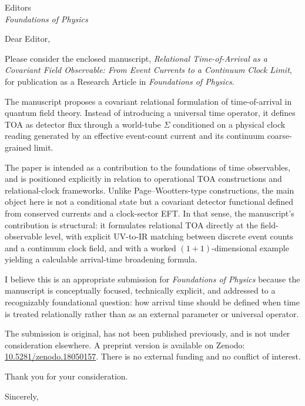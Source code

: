 \documentclass[a4paper,11pt]{letter}
\date{\today}
\begin{document}
    
    \begin{letter}{Editors\\ \textit{Foundations of Physics}}

\opening{Dear Editor,}

Please consider the enclosed manuscript,
\textit{Relational Time-of-Arrival as a Covariant Field Observable: From Event Currents to a Continuum Clock Limit},
for publication as a Research Article in \textit{Foundations of Physics}.

The manuscript proposes a covariant relational formulation of time-of-arrival in quantum field theory. Instead of introducing a universal time operator, it defines TOA as detector flux through a world-tube $\Sigma$ conditioned on a physical clock reading generated by an effective event-count current and its continuum coarse-grained limit.

The paper is intended as a contribution to the foundations of time observables, and is positioned explicitly in relation to operational TOA constructions and relational-clock frameworks. Unlike Page--Wootters-type constructions, the main object here is not a conditional state but a covariant detector functional defined from conserved currents and a clock-sector EFT. In that sense, the manuscript's contribution is structural: it formulates relational TOA directly at the field-observable level, with explicit UV-to-IR matching between discrete event counts and a continuum clock field, and with a worked $(1+1)$-dimensional example yielding a calculable arrival-time broadening formula.

I believe this is an appropriate submission for \textit{Foundations of Physics} because the manuscript is conceptually focused, technically explicit, and addressed to a recognizably foundational question: how arrival time should be defined when time is treated relationally rather than as an external parameter or universal operator.

The submission is original, has not been published previously, and is not under consideration elsewhere. A preprint version is available on Zenodo:
\href{https://doi.org/10.5281/zenodo.18050157}{10.5281/zenodo.18050157}.
There is no external funding and no conflict of interest.

Thank you for your consideration.

\closing{Sincerely,}
    
    \end{letter}
\end{document}
